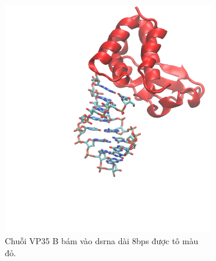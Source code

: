 \documentclass[12pt,a4paper,reqno, oneside]{book}
\begin{document}
%	
		\begin{figure}[p]
		\centering
		\begin{subfigure}[h]{0.45\textheight}
		\includegraphics[width=0.9\linewidth,natwidth=610,natheight=642]{VP35_B.png}
		\vspace{-30pt}
		\caption{Chuỗi VP35 B bám vào \gls{dsrna} dài 8bps được tô màu đỏ.}
		\label{fig:vp35b}
		\end{subfigure}
		\\
		\begin{subfigure}[h]{0.4\textheight}
		\centering

\end{subfigure}
\end{figure}
\end{document}
